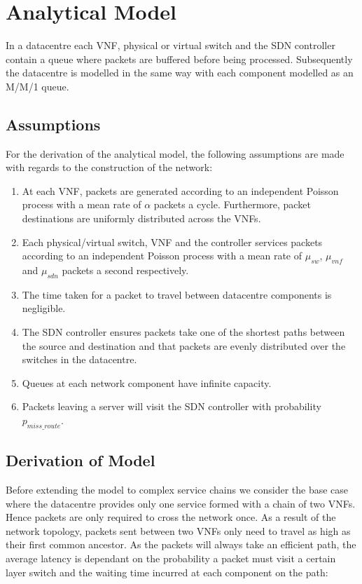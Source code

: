 
\section{Analytical Model}
\label{sec:analytical_model}

In a datacentre each VNF, physical or virtual switch and the SDN controller contain a queue where packets are buffered before being processed. Subsequently the datacentre is modelled in the same way with each component modelled as an M/M/1 queue.

\subsection{Assumptions}
For the derivation of the analytical model, the following assumptions are made with regards to the construction of the network:

\begin{enumerate}
\item At each VNF, packets are generated according to an independent Poisson process with a mean rate of $\alpha$ packets a cycle. Furthermore, packet destinations are uniformly distributed across the VNFs.
\item Each physical/virtual switch, VNF and the controller services packets according to an independent Poisson process with a mean rate of $\mu_{sw}$, $\mu_{vnf}$ and $\mu_{sdn}$ packets a second respectively.
\item The time taken for a packet to travel between datacentre components is negligible.
\item The SDN controller ensures packets take one of the shortest paths between the source and destination and that packets are evenly distributed over the switches in the datacentre.
\item Queues at each network component have infinite capacity.
\item Packets leaving a server will visit the SDN controller with probability $p_{miss\_route}$.
\end{enumerate}

\subsection{Derivation of Model}
Before extending the model to complex service chains we consider the base case where the datacentre provides only one service formed with a chain of two VNFs. Hence packets are only required to cross the network once. As a result of the network topology, packets sent between two VNFs only need to travel as high as their first common ancestor. As the packets will always take an efficient path, the average latency is dependant on the probability a packet must visit a certain layer switch and the waiting time incurred at each component on the path:


